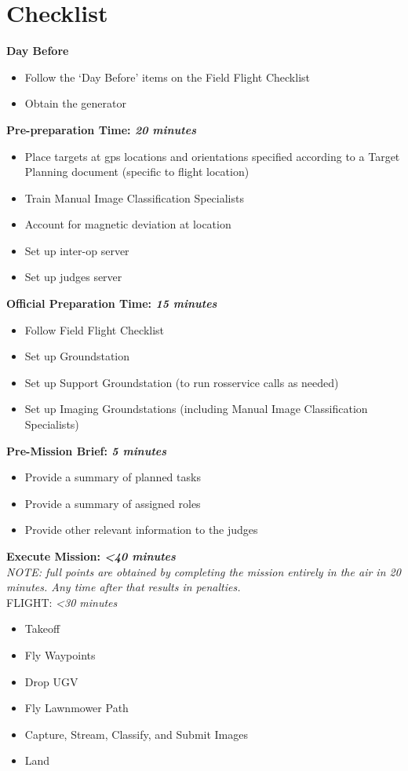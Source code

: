 \documentclass[]{auvsi_doc}
\begin{document}
\section{Checklist}

\textbf{Day Before}
\begin{itemize}
	\item Follow the `Day Before' items on the Field Flight Checklist
	\item Obtain the generator
\end{itemize}

\hrulefill

\textbf{Pre-preparation Time: \textit{20 minutes}}
\begin{itemize}
	\item Place targets at gps locations and orientations specified according to a Target Planning document (specific to flight location)
	\item Train Manual Image Classification Specialists
	\item Account for magnetic deviation at location
	\item Set up inter-op server
	\item Set up judges server 
\end{itemize}

\hrulefill

\textbf{Official Preparation Time: \textit{15 minutes}}
\begin{itemize}
	\item Follow Field Flight Checklist
	\item Set up Groundstation
	\item Set up Support Groundstation (to run rosservice calls as needed)
	\item Set up Imaging Groundstations (including Manual Image Classification Specialists)
\end{itemize}

\hrulefill

\textbf{Pre-Mission Brief: \textit{5 minutes}}
\begin{itemize}
	\item Provide a summary of planned tasks
	\item Provide a summary of assigned roles
	\item Provide other relevant information to the judges
\end{itemize}

\hrulefill

\textbf{Execute Mission: \textit{\textless40 minutes}}\\
\indent \textit{NOTE: full points are obtained by completing the mission entirely in the air in 20 minutes. Any time after that results in penalties.}\\
FLIGHT: \textit{\textless30 minutes}
\begin{itemize}
	\item Takeoff
	\item Fly Waypoints
	\item Drop UGV
	\item Fly Lawnmower Path
	\item Capture, Stream, Classify, and Submit Images
	\item Land
\end{itemize}
\end{document}
